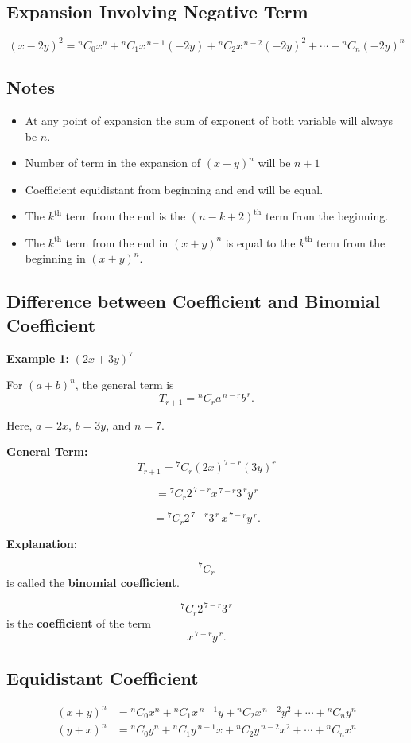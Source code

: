 \documentclass[12pt]{article}
\begin{document}
\subsection{Expansion Involving Negative Term}
\[
(x-2y)^2 = {}^{n}C_{0}x^n 
+ {}^{n}C_{1}x^{\,n-1}(-2y) 
+ {}^{n}C_{2}x^{\,n-2}(-2y)^2 
+ \cdots 
+ {}^{n}C_{n}(-2y)^n
\]
\subsection{Notes}
\begin{itemize}
    \item At any point of expansion the sum of exponent of both variable will always be $n$.
    \item Number of term in the expansion of $(x+y)^n$ will be $n+1$
    \item Coefficient equidistant from beginning and end will be equal.
    \item The $k^{\text{th}}$ term from the end is the $(n-k+2)^{\text{th}}$ term from the beginning.
    
    \item The $k^{\text{th}}$ term from the end in $(x+y)^n$ is equal to the $k^{\text{th}}$ term from the beginning in $(x+y)^n$.
\end{itemize}
\newpage
\subsection{Difference between Coefficient and Binomial Coefficient}

\textbf{Example 1:} $(2x+3y)^7$

For $(a+b)^n$, the general term is
\[
T_{r+1} = {}^{n}C_{r} a^{\,n-r} b^{\,r}.
\]

Here, $a=2x$, $b=3y$, and $n=7$.

\medskip

\textbf{General Term:}
\[
T_{r+1} = {}^{7}C_{r} (2x)^{7-r} (3y)^{r}
\]

\[
= {}^{7}C_{r} 2^{\,7-r} x^{\,7-r} 3^{\,r} y^{\,r}
\]

\[
= {}^{7}C_{r} 2^{\,7-r} 3^{\,r} \, x^{\,7-r} y^{\,r}.
\]

\medskip

\textbf{Explanation:}

\[
{}^{7}C_{r}
\]
is called the \textbf{binomial coefficient}.

\[
{}^{7}C_{r} 2^{\,7-r} 3^{\,r}
\]
is the \textbf{coefficient} of the term 
\[
x^{\,7-r} y^{\,r}.
\]
\subsection{Equidistant Coefficient}
\[
\begin{aligned}
    (x+y)^n &= {}^{n}C_{0}x^n 
+ {}^{n}C_{1}x^{\,n-1}y 
+ {}^{n}C_{2}x^{\,n-2}y^2 
+ \cdots 
+ {}^{n}C_{n}y^n \\
(y+x)^n &= {}^{n}C_{0}y^n 
+ {}^{n}C_{1}y^{\,n-1}x 
+ {}^{n}C_{2}y^{\,n-2}x^2 
+ \cdots 
+ {}^{n}C_{n}x^n
\end{aligned}
\]
\end{document}
